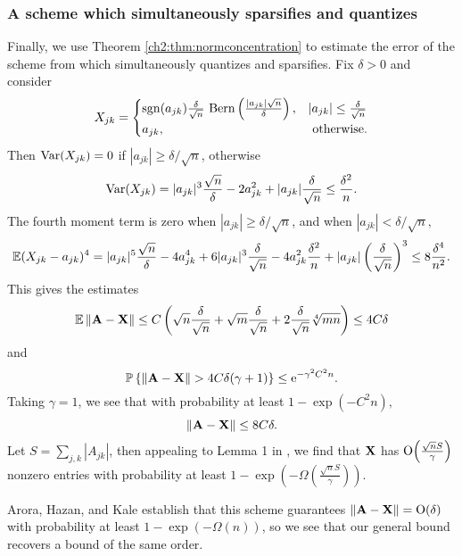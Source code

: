 \subsubsection{A scheme which simultaneously sparsifies and quantizes}

Finally, we use Theorem \ref{ch2:thm:normconcentration} to estimate the error of
the scheme from \cite{AHK06} which simultaneously quantizes and
sparsifies. Fix $\delta>0$ and consider 
\[
X_{jk}=\begin{cases}
\operatorname{sgn}(a_{jk})\frac{\delta}{\sqrt{n}}\text{
Bern}\left(\frac{|a_{jk}|\sqrt{n}}{\delta}\right), &
|a_{jk}|\leq\frac{\delta}{\sqrt{n}}\\
a_{jk}, & \text{ otherwise}.\end{cases}
\]
Then $\operatorname{Var}(X_{jk})=0$ if $|a_{jk}|\geq\delta/\sqrt{n}$,
otherwise 
\[
\operatorname{Var}(X_{jk})=|a_{jk}|^{3}\frac{\sqrt{n}}{\delta}-2a_{jk}^{2}+|a_{jk}|\frac{
\delta}{\sqrt{n}}\leq\frac{\delta^{2}}{n}.
\]
The fourth moment term is zero when $|a_{jk}| \geq \delta/\sqrt{n}$, and
when $|a_{jk}| < \delta/\sqrt{n},$
\[
\mathbb{E}(X_{jk}-a_{jk})^{4}=|a_{jk}|^{5}\frac{\sqrt{n}}{\delta}-4a_{jk}^{4}+6|a_{jk}|^
{3}\frac{\delta}{\sqrt{n}}-4a_{jk}^{2}\frac{\delta^{2}}{n}+|a_{jk}|\left(\frac{
\delta}{\sqrt{n}}\right)^{3}\leq8\frac{\delta^{4}}{n^{2}}.
\]
This gives the estimates 
\[
\mathbb{E}\left\|\mathbf{A}-\mathbf{X}\right\|\leq
C\left(\sqrt{n}\frac{\delta}{\sqrt{n}}+\sqrt{m}\frac{\delta}{\sqrt{n}}+2\frac{
\delta}{\sqrt{n}}\sqrt[4]{mn}\right)\leq4C\delta
\]
and 
\[
\Prob{\norm{\mat{A}-\mat{X}}>4C\delta(\gamma+1)}\leq \e^{-\gamma^{2}C^{2}n}.
\]
Taking $\gamma=1$, we see that with probability at least $1-\exp(-C^{2}n),$
\[
\left\|\mathbf{A}-\mathbf{X}\right\|\leq8C\delta.
\]
Let $S=\sum\nolimits_{j,k}|A_{jk}|$, then appealing to Lemma 1 in \cite{AHK06},
we find that $\mathbf{X}$ has $\mathop{\text{O}}\!\left(\tfrac{\sqrt{n} S}{\gamma}\right)$ nonzero entries
with probability at least
$1-\exp\left(-\Omega\left(\tfrac{\sqrt{n}S}{\gamma}\right)\right)$.

Arora, Hazan, and Kale establish that this scheme guarantees
$\left\|\mathbf{A}-\mathbf{X}\right\|=\mathop{\text{O}}\!\left(\delta\right)$ with probability at least
$1-\exp(-\Omega(n))$, so we see that our general bound recovers a bound of the
same order.


